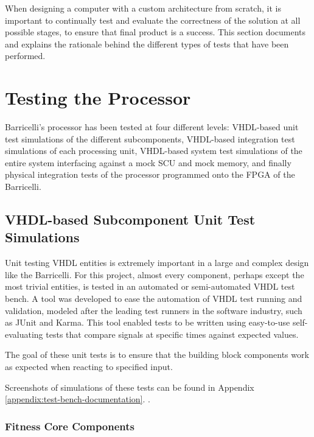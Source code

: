 When designing a computer with a custom architecture from scratch, it is important to continually test and evaluate the correctness of the solution at all possible stages, to ensure that final product is a success.
This section documents and explains the rationale behind the different types of tests that have been performed.

\section{Testing the Processor}

Barricelli's processor has been tested at four different levels: \gls{VHDL}-based unit test simulations of the different subcomponents,  \gls{VHDL}-based integration test simulations of each processing unit, \gls{VHDL}-based system test simulations of the entire system interfacing against a mock SCU and mock memory, and finally physical integration tests of the processor programmed onto the FPGA of the Barricelli.


\subsection{\gls{VHDL}-based Subcomponent Unit Test Simulations}

Unit testing VHDL entities is extremely important in a large and complex design like the Barricelli.
For this project, almost every component, perhaps except the most trivial entities, is tested in an automated or semi-automated VHDL test bench.
A tool was developed to ease the automation of VHDL test running and validation, modeled after the leading test runners in the software industry, such as JUnit\cite{junit} and Karma\cite{karma}.
This tool enabled tests to be written using easy-to-use self-evaluating tests that compare signals at specific times against expected values.

The goal of these unit tests is to ensure that the building block components work as expected when reacting to specified input.

Screenshots of simulations of these tests can be found in Appendix \ref{appendix:test-bench-documentation}.
.

\subsubsection{Fitness Core Components}

